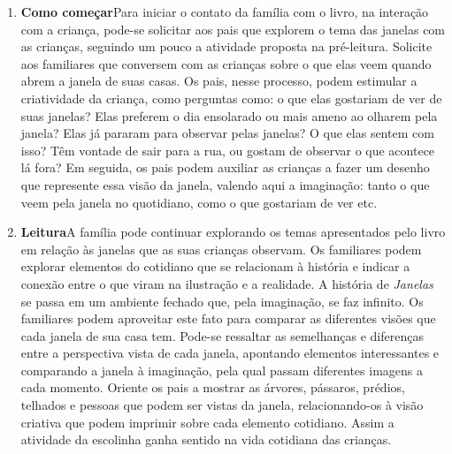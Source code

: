 \documentclass[11pt]{extarticle}
\begin{document}
\begin{enumerate}
\item \textbf{Como começar}\quad Para iniciar o contato da família com o livro, na interação com a criança, pode-se solicitar aos pais que explorem o tema das janelas com as crianças, seguindo um pouco a atividade proposta na pré-leitura.
Solicite aos familiares que conversem com as crianças sobre o que elas veem quando abrem a janela de suas casas. Os pais, nesse processo, podem estimular a criatividade da criança, como perguntas como: o que elas gostariam de ver de suas janelas? Elas preferem o dia ensolarado ou mais ameno ao olharem pela janela? Elas já pararam para observar pelas janelas? O que elas sentem com isso? Têm vontade de sair para a rua, ou gostam de observar o que acontece lá fora?
Em seguida, os pais podem auxiliar as crianças a fazer um desenho que represente essa visão da janela, valendo aqui a imaginação: tanto o que veem pela janela no quotidiano, como o que gostariam de ver etc.




\item \textbf{Leitura}\quad A família pode continuar explorando os temas apresentados pelo livro em relação às janelas que as suas crianças observam.
Os familiares podem explorar 
elementos do cotidiano que se relacionam à história e indicar a conexão 
entre o que viram na ilustração e a realidade. A história de \textit{Janelas}
se passa em um ambiente fechado que, pela imaginação, se faz infinito.
Os familiares podem aproveitar este fato 
para comparar as diferentes visões que cada janela de sua casa tem.
Pode-se ressaltar as semelhanças e diferenças entre a perspectiva vista de cada janela, apontando elementos interessantes e comparando a janela à imaginação, pela qual passam diferentes imagens a cada momento.
Oriente os pais a mostrar as 
árvores, pássaros, prédios, telhados e pessoas que podem ser vistas da janela, relacionando-os à visão criativa que podem imprimir sobre cada elemento cotidiano.
Assim a atividade da escolinha ganha sentido na vida cotidiana das crianças.



\end{enumerate}
\end{document}
